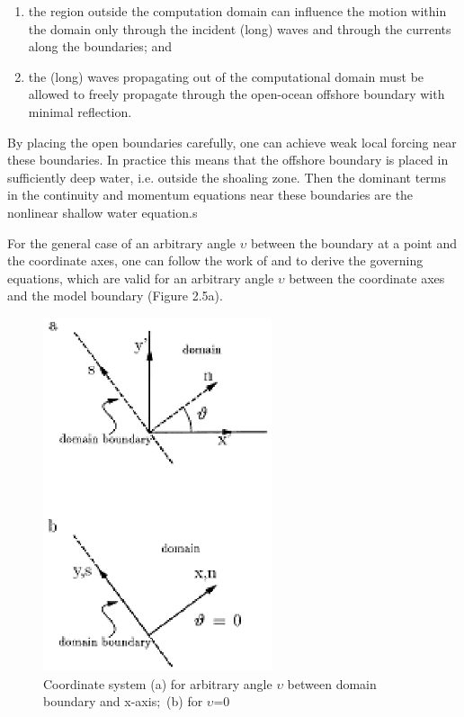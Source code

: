 \begin{enumerate}
  \item  the region outside the computation domain can influence the motion within the domain only through the incident (long) waves and through the currents along the boundaries; and
  \item  the (long) waves propagating out of the computational domain must be allowed to freely propagate through the open-ocean offshore boundary with minimal reflection.  
\end{enumerate}

By placing the open boundaries carefully, one can achieve weak local forcing near these boundaries. In practice this means that the offshore boundary is placed in sufficiently deep water, i.e. outside the shoaling zone. Then the dominant terms in the continuity and momentum equations near these boundaries are the nonlinear shallow water equation.s 

For the general case of an arbitrary angle $\upsilon $ between the boundary at a point and the coordinate axes, one can follow the work of \citet{Abbott1979} and \citet{Verboom1981} to derive the governing equations, which are valid for an arbitrary angle $\upsilon $ between the coordinate axes and the model boundary (Figure 2.5a).

\begin{figure}[h]
  \centering
  \includegraphics[width=0.6\textwidth]{image9} 
  \caption{Coordinate system (a) for arbitrary angle $\upsilon $ between domain boundary and x-axis$;$ (b) for $\upsilon $=0}
  \label{fig:image9}
\end{figure}

